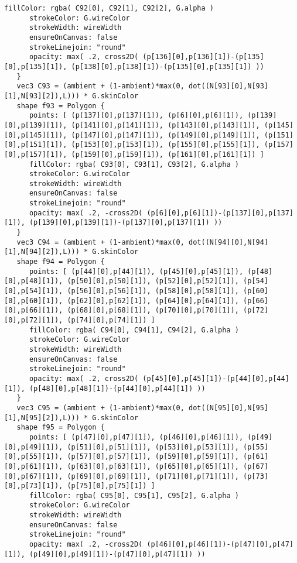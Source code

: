 \begin{lstlisting}[language=Sty-RT,escapechar=@]
      fillColor: rgba( C92[0], C92[1], C92[2], G.alpha )
      strokeColor: G.wireColor
      strokeWidth: wireWidth
      ensureOnCanvas: false
      strokeLinejoin: "round"
      opacity: max( .2, cross2D( (p[136][0],p[136][1])-(p[135][0],p[135][1]), (p[138][0],p[138][1])-(p[135][0],p[135][1]) ))
   }
   vec3 C93 = (ambient + (1-ambient)*max(0, dot((N[93][0],N[93][1],N[93][2]),L))) * G.skinColor
   shape f93 = Polygon {
      points: [ (p[137][0],p[137][1]), (p[6][0],p[6][1]), (p[139][0],p[139][1]), (p[141][0],p[141][1]), (p[143][0],p[143][1]), (p[145][0],p[145][1]), (p[147][0],p[147][1]), (p[149][0],p[149][1]), (p[151][0],p[151][1]), (p[153][0],p[153][1]), (p[155][0],p[155][1]), (p[157][0],p[157][1]), (p[159][0],p[159][1]), (p[161][0],p[161][1]) ]
      fillColor: rgba( C93[0], C93[1], C93[2], G.alpha )
      strokeColor: G.wireColor
      strokeWidth: wireWidth
      ensureOnCanvas: false
      strokeLinejoin: "round"
      opacity: max( .2, -cross2D( (p[6][0],p[6][1])-(p[137][0],p[137][1]), (p[139][0],p[139][1])-(p[137][0],p[137][1]) ))
   }
   vec3 C94 = (ambient + (1-ambient)*max(0, dot((N[94][0],N[94][1],N[94][2]),L))) * G.skinColor
   shape f94 = Polygon {
      points: [ (p[44][0],p[44][1]), (p[45][0],p[45][1]), (p[48][0],p[48][1]), (p[50][0],p[50][1]), (p[52][0],p[52][1]), (p[54][0],p[54][1]), (p[56][0],p[56][1]), (p[58][0],p[58][1]), (p[60][0],p[60][1]), (p[62][0],p[62][1]), (p[64][0],p[64][1]), (p[66][0],p[66][1]), (p[68][0],p[68][1]), (p[70][0],p[70][1]), (p[72][0],p[72][1]), (p[74][0],p[74][1]) ]
      fillColor: rgba( C94[0], C94[1], C94[2], G.alpha )
      strokeColor: G.wireColor
      strokeWidth: wireWidth
      ensureOnCanvas: false
      strokeLinejoin: "round"
      opacity: max( .2, cross2D( (p[45][0],p[45][1])-(p[44][0],p[44][1]), (p[48][0],p[48][1])-(p[44][0],p[44][1]) ))
   }
   vec3 C95 = (ambient + (1-ambient)*max(0, dot((N[95][0],N[95][1],N[95][2]),L))) * G.skinColor
   shape f95 = Polygon {
      points: [ (p[47][0],p[47][1]), (p[46][0],p[46][1]), (p[49][0],p[49][1]), (p[51][0],p[51][1]), (p[53][0],p[53][1]), (p[55][0],p[55][1]), (p[57][0],p[57][1]), (p[59][0],p[59][1]), (p[61][0],p[61][1]), (p[63][0],p[63][1]), (p[65][0],p[65][1]), (p[67][0],p[67][1]), (p[69][0],p[69][1]), (p[71][0],p[71][1]), (p[73][0],p[73][1]), (p[75][0],p[75][1]) ]
      fillColor: rgba( C95[0], C95[1], C95[2], G.alpha )
      strokeColor: G.wireColor
      strokeWidth: wireWidth
      ensureOnCanvas: false
      strokeLinejoin: "round"
      opacity: max( .2, -cross2D( (p[46][0],p[46][1])-(p[47][0],p[47][1]), (p[49][0],p[49][1])-(p[47][0],p[47][1]) ))

\end{lstlisting}
